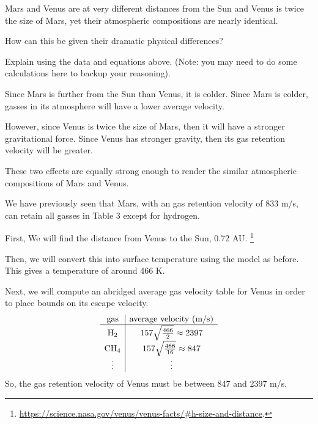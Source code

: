 \documentclass[../astro_4]{subfiles}
\begin{document}
\begin{problem}
Mars and Venus are at very different distances from the Sun and Venus is twice the size of Mars,
yet their atmospheric compositions are nearly identical.

How can this be given their dramatic physical differences?

Explain using the data and equations above.
(Note: you may need to do some calculations here to backup your reasoning).
\end{problem}


Since Mars is further from the Sun than Venus, it is colder.
Since Mars is colder, gasses in its atmosphere will have a lower average velocity.

However, since Venus is twice the size of Mars, then it will have a stronger gravitational force.
Since Venus has stronger gravity, then its gas retention velocity will be greater.

These two effects are equally strong enough to render the similar atmospheric compositions of Mars and Venus.

We have previously seen that Mars, with an gas retention velocity of 833 m/s, can retain all gasses in Table 3 except for hydrogen.

First, We will find the distance from Venus to the Sun, 0.72 AU.
\footnote{\url{https://science.nasa.gov/venus/venus-facts/\#h-size-and-distance}.}

Then, we will convert this into surface temperature using the model as before.
This gives a temperature of around 466 K.

Next, we will compute an abridged average gas velocity table for Venus in order to place bounds on its escape velocity.
\[
	\begin{array}{c | c}
		\text{gas}  & \text{average velocity (m/s)}        \\
		\hline
		\text{H}_2  & 157\sqrt{\frac{466}{2}} \approx 2397 \\
		\text{CH}_4 & 157\sqrt{\frac{466}{16}} \approx 847 \\
		\vdots      & \vdots                               \\
	\end{array}
\]
So, the gas retention velocity of Venus must be between 847 and 2397 m/s.
\end{document}

